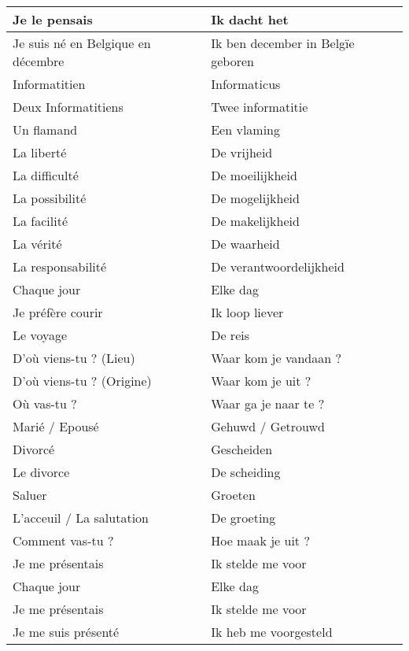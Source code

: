 \documentclass[a4paper]{article}
\begin{document}
\begin{center}
\begin{tabular}{|l|l|}
    \hline
    Je le pensais & Ik dacht het\\
    \hline
    Je suis né en Belgique en décembre & Ik ben december in Belgïe geboren\\
    \hline
    Informatitien & Informaticus\\
    \hline
    Deux Informatitiens & Twee informatitie\\
    \hline
    Un flamand & Een vlaming\\
    \hline
    La liberté & De vrijheid\\
    \hline
    La difficulté & De moeilijkheid\\
    \hline
    La possibilité & De mogelijkheid\\
    \hline
    La facilité & De makelijkheid\\
    \hline
    La vérité & De waarheid\\
    \hline
    La responsabilité & De verantwoordelijkheid\\
    \hline
    Chaque jour & Elke dag\\
    \hline
    Je préfère courir & Ik loop liever\\
    \hline
    Le voyage & De reis\\
    \hline
    D'où viens-tu ? (Lieu) & Waar kom je vandaan ?\\
    \hline
    D'où viens-tu ? (Origine) & Waar kom je uit ?\\
    \hline
    Où vas-tu ? & Waar ga je naar te ?\\
    \hline
    Marié  / Epousé & Gehuwd / Getrouwd\\
    \hline
    Divorcé & Gescheiden\\
    \hline
    Le divorce & De scheiding\\
    \hline
    Saluer & Groeten \\
    \hline
    L'acceuil / La salutation & De groeting\\
    \hline
    Comment vas-tu ? & Hoe maak je uit ? \\
    \hline
    Je me présentais & Ik stelde me voor\\
    \hline
    Chaque jour & Elke dag\\
    \hline
    Je me présentais & Ik stelde me voor\\
    \hline
    Je me suis présenté & Ik heb me voorgesteld\\
    \hline
  \end{tabular}\\
\end{center}
\end{document}
